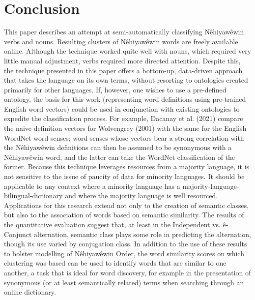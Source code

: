 \section{Conclusion}
This paper describes an attempt at semi-automatically classifying Nêhiyawêwin verbs and nouns. Resulting clusters of Nêhiyawêwin words are freely available online.  Although the technique worked quite well with nouns, which required very little manual adjustment, verbs required more directed attention. Despite this, the technique presented in this paper offers a bottom-up, data-driven approach that takes the language on its own terms, without resorting to ontologies created primarily for other languages. If, however, one wishes to use a pre-defined ontology, the basis for this work (representing word definitions using pre-trained English word vectors) could be used in conjunction with existing ontologies to expedite the classification process. For example, Dacanay et al. (2021) compare the naive definition vectors for Wolvengrey (2001) with the same for the English WordNet word senses; word senses whose vectors bear a strong correlation with the Nêhiyawêwin definitions can then be assumed to be synonymous with a Nêhiyawêwin word, and the latter can take the WordNet classification of the former. Because this technique leverages resources from a majority language, it is not sensitive to the issue of paucity of data for minority languages. It should be applicable to any context where a minority language has a majority-language-bilingual-dictionary and where the majority language is well resourced. Applications for this research extend not only to the creation of semantic classes, but also to the association of words based on semantic similarity. The results of the quantitative evaluation suggest that, at least in the Independent vs. ê-Conjunct alternation, semantic class plays some role in predicting the alternation, though its use varied by conjugation class. In addition to the use of these results to bolster modelling of Nêhiyawêwin Order, the word similarity scores on which clustering was based can be used to identify words that are similar to one another, a task that is ideal for word discovery, for example in the presentation of synonymous (or at least semantically related) terms when searching through an online dictionary.

